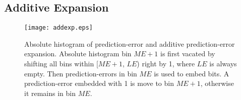 \documentclass[journal]{IEEEtran}
\begin{document}
\subsection{Additive Expansion}\label{sub:ade}

\begin{figure}[t]
    \centering
    \texttt{[image: addexp.eps]}
    \caption{\label{fig:addexp} Absolute histogram of prediction-error and additive prediction-error
    expansion. Absolute histogram bin $\mathit{ME}+1$ is first vacated by shifting all bins within
    [$\mathit{ME}+1$, $\mathit{LE}$) right by 1, where $\mathit{LE}$ is always empty. Then
    prediction-errors in bin $\mathit{ME}$ is used to embed bits. A prediction-error embedded with 1
    is move to bin $\mathit{ME}+1$, otherwise it remains in bin $\mathit{ME}$. }
\end{figure}
\end{document}
